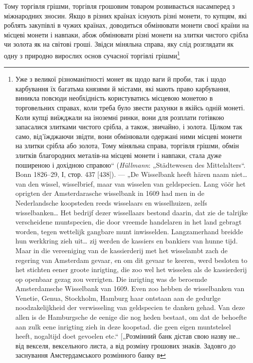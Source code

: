 Тому торгівля грішми, торгівля грошовим товаром розвивається
насамперед з міжнародних зносин. Якщо в різних країнах
існують різні монети, то купцям, які роблять закупівлі в чужих
країнах, доводиться обмінювати монети своєї країни на місцеві
монети і навпаки, абож обмінювати різні монети на злитки чистого
срібла чи золота як на світові гроші. Звідси міняльна справа, яку
слід розглядати як одну з природно вирослих основ сучасної торгівлі
грішми\footnote{
Уже з великої різноманітності монет як щодо ваги й проби, так і щодо
карбування їх багатьма князями й містами, які мають право карбування, виникла
повсюди необхідність користуватись місцевою монетою в торговельних справах,
коли треба було звести рахунки в якійсь одній монеті. Коли купці
виїжджали на іноземні ринки, вони для розплати готівкою запасалися злитками
чистого срібла, а також, звичайно, і золота. Цілком так само, від’їжджаючи
звідти, вони обмінювали одержані ними місцеві монети на злитки
срібла або золота, Тому міняльна справа, торгівля грішми, обмін злитків благородних
металів-на місцеві монети і навпаки, стала дуже поширеною і дохідною
справою“ (\emph{Hüllmann}: „Städtewesen des Mittelalters“. Bonn 1826--29,
І, стор. 437 [438]). — „De Wisselbank heeft hären naam niet\dots{} van den wissel, wisselbrief,
maar van wisselen van geldspecien. Lang vöör het oprigten der Amsterdarasche
wisselbank in 1609 had men in de Nederlandsche koopsteden reeds wisselaars
en wisselhuizen, zelfs wisselbanken\dots{} Het bedrijf dezer wissellaars bestond
daarin, dat zie de talrijke verscheidene muntspecien, die door vreemde handelaren
in het land gebragt worden, tegen wettelijk gangbare munt inwisselden. Langzamerhand
breidde hun werkkring zieh uit\dots{} zij werden de kassiers en bankiers van
hunne tijd. Maar in die vereeniging van de kassierderij met het wisselambt zach
de regering van Amsterdam gevaar, en om dit gevaar te keeren, werd besloten to
het stichten eener groote inrigting, die zoo wel het wisselen als de kassierderij op
openbaar gezag zou verrigten. Die inrigting was de beroemde Amsterdamsche Wisselbank
van 1609. Even zoo hebben de wisselbanken van Venetie, Genua, Stockholm,
Hamburg haar ontstaan aan de gedurlge noodzakelijkheid der verwisseling van
geldspecien te danken gehad. Van deze allen is de Hamburgsche de eenige die
nog heden bestaat, om dat de behoefte aan zulk eene inrigting zieh in deze
koopstad. die geen eigen muntstelsel heeft, nogaltijd doet gevoelen etc.“ [„Розмінний
банк дістав свою назву не\dots{} від векселя, вексельного листа, а від розміну
грошових знаків. Задовго до заснування Амстердамського розмінного банку в
}
